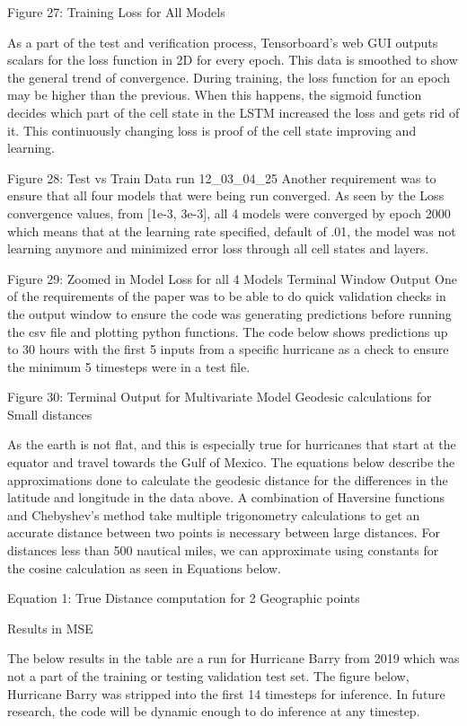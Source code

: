 \documentclass{article}
\begin{document}
Figure 27: Training Loss for All Models

As a part of the test and verification process, Tensorboard's web GUI outputs scalars for the loss function in 2D for every epoch. This data is smoothed to show the general trend of convergence. During training, the loss function for an epoch may be higher than the previous. When this happens, the sigmoid function decides which part of the cell state in the LSTM increased the loss and gets rid of it. This continuously changing loss is proof of the cell state improving and learning.

Figure 28: Test vs Train Data run 12\_03\_04\_25
Another requirement was to ensure that all four models that were being run converged. As seen by the Loss convergence values, from [1e-3, 3e-3], all 4 models were converged by epoch 2000 which means that at the learning rate specified, default of .01, the model was not learning anymore and minimized error loss through all cell states and layers.

Figure 29: Zoomed in Model Loss for all 4 Models
Terminal Window Output
One of the requirements of the paper was to be able to do quick validation checks in the output window to ensure the code was generating predictions before running the csv file and plotting python functions.
The code below shows predictions up to 30 hours with the first 5 inputs from a specific hurricane as a check to ensure the minimum 5 timesteps were in a test file.

Figure 30: Terminal Output for Multivariate Model
Geodesic calculations for Small distances

As the earth is not flat, and this is especially true for hurricanes that start at the equator and travel towards the Gulf of Mexico. The equations below describe the approximations done to calculate the geodesic distance for the differences in the latitude and longitude in the data above. A combination of Haversine functions and Chebyshev's method take multiple trigonometry calculations to get an accurate distance between two points is necessary between large distances. For distances less than 500 nautical miles, we can approximate using constants for the cosine calculation as seen in Equations below.

Equation 1: True Distance computation for 2 Geographic points

Results in MSE

The below results in the table are a run for Hurricane Barry from 2019 which was not a part of the training or testing validation test set. The figure below, Hurricane Barry was stripped into the first 14 timesteps for inference. In future research, the code will be dynamic enough to do inference at any timestep. 
\end{document}
